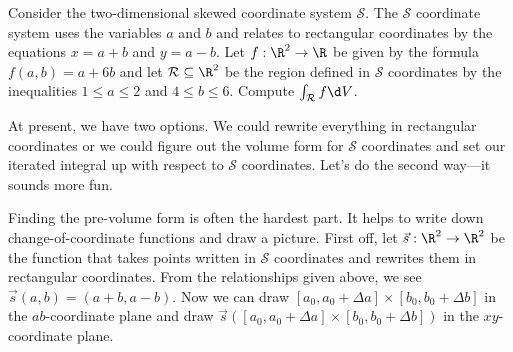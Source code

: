 \begin{example}
	Consider the two-dimensional 
	skewed coordinate system $\mathcal S$.  The $\mathcal S$
	coordinate system uses the variables $a$ and $b$ and relates
	to rectangular coordinates by the equations $x=a+b$ and $y=a-b$.
	Let $f:\R^2\to\R$ be given by the formula $f(a,b)=a+6b$ and let $\mathcal R\subseteq\R^2$
	be the region defined in $\mathcal S$ coordinates by the inequalities
	$1\leq a\leq 2$ and $4\leq b\leq 6$.  Compute $\int_{\mathcal R} f\d V$.

	At present, we have two options.  We could rewrite everything in 
	rectangular coordinates or we could figure out the volume form for $\mathcal S$ 
	coordinates and set our iterated integral up with respect to $\mathcal S$ coordinates.
	Let's do the second way---it sounds more fun.

	Finding the pre-volume form is often the hardest part.  It helps 
	to write down change-of-coordinate functions and draw a picture.
	First off, let $\vec s:\R^2\to\R^2$ be the function that takes points
	written in $\mathcal S$ coordinates and rewrites them in rectangular coordinates.
	From the relationships given above, we see $\vec s(a,b) = (a+b,a-b)$.  Now
	we can draw $[a_0,a_0+\Delta a]\times [b_0,b_0+\Delta b]$ in the $ab$-coordinate
	plane and draw $\vec s([a_0,a_0+\Delta a]\times [b_0,b_0+\Delta b])$ in the
	$xy$-coordinate plane.

	\begin{center}
\end{center}
\end{example}
